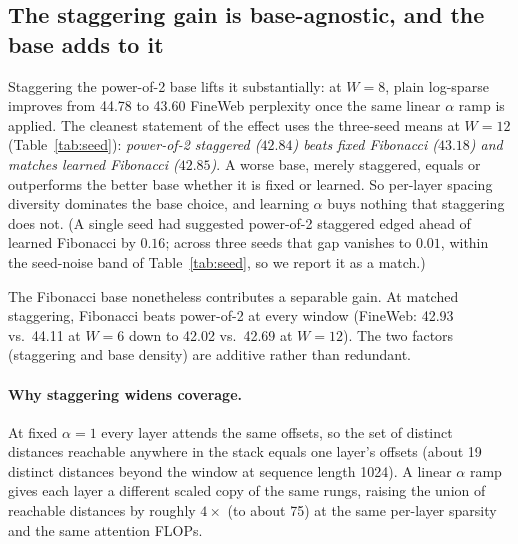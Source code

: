 \documentclass[11pt]{article}
\begin{document}
\subsection{The staggering gain is base-agnostic, and the base adds to it}
\label{sec:ablation}

Staggering the power-of-2 base lifts it substantially: at $W=8$, plain
log-sparse improves from 44.78 to 43.60 FineWeb perplexity once the same linear
$\alpha$ ramp is applied. The cleanest statement of the effect uses the
three-seed means at $W{=}12$ (Table~\ref{tab:seed}): \emph{power-of-2 staggered
($42.84$) beats fixed Fibonacci ($43.18$) and matches learned Fibonacci
($42.85$)}. A worse base, merely staggered, equals or outperforms the better base
whether it is fixed or learned. So per-layer spacing diversity dominates the base
choice, and learning $\alpha$ buys nothing that staggering does not. (A single
seed had suggested power-of-2 staggered edged ahead of learned Fibonacci by
$0.16$; across three seeds that gap vanishes to $0.01$, within the seed-noise
band of Table~\ref{tab:seed}, so we report it as a match.)

The Fibonacci base nonetheless contributes a separable gain. At matched
staggering, Fibonacci beats power-of-2 at every window (FineWeb: 42.93 vs.\ 44.11
at $W{=}6$ down to 42.02 vs.\ 42.69 at $W{=}12$). The two factors (staggering
and base density) are additive rather than redundant.

\paragraph{Why staggering widens coverage.}
At fixed $\alpha=1$ every layer attends the same offsets, so the set of distinct
distances reachable anywhere in the stack equals one layer's offsets (about 19
distinct distances beyond the window at sequence length 1024). A linear $\alpha$
ramp gives each layer a different scaled copy of the same rungs, raising the
union of reachable distances by roughly $4\times$ (to about 75) at the same
per-layer sparsity and the same attention FLOPs.
\end{document}
